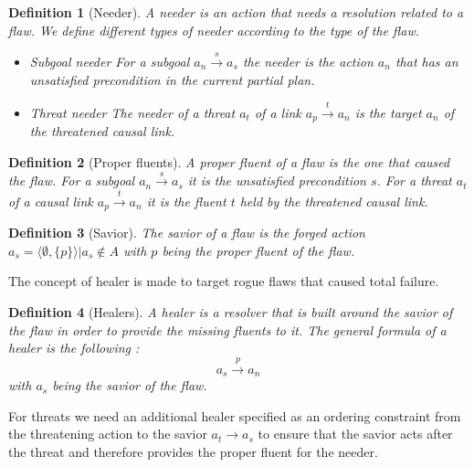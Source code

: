 \documentclass[]{article}
\newtheorem{definition}{Definition}
\begin{document}
\begin{definition}[Needer]

A needer is an action that needs a resolution related to a flaw. We
define different types of needer according to the type of the flaw.

\begin{itemize}
\item
  Subgoal needer For a subgoal \(a_n \xrightarrow{s} a_s\) the needer is
  the action \(a_n\) that has an unsatisfied precondition in the current
  partial plan.
\item
  Threat needer The needer of a threat \(a_t\) of a link
  \(a_p \xrightarrow{t} a_n\) is the target \(a_n\) of the threatened
  causal link.
\end{itemize}

\end{definition}

\begin{definition}[Proper fluents]

A proper fluent of a flaw is the one that caused the flaw. For a subgoal
\(a_n \xrightarrow{s} a_s\) it is the unsatisfied precondition \(s\).
For a threat \(a_t\) of a causal link \(a_p \xrightarrow{t} a_n\) it is
the fluent \(t\) held by the threatened causal link.

\end{definition}

\begin{definition}[Savior]

The savior of a flaw is the forged action
\(a_s = \langle \emptyset, \{p\} \rangle | a_s \notin A\) with \(p\)
being the proper fluent of the flaw.

\end{definition}

The concept of healer is made to target rogue flaws that caused total
failure.

\begin{definition}[Healers]

A healer is a resolver that is built around the savior of the flaw in
order to provide the missing fluents to it. The general formula of a
healer is the following : \[a_s \xrightarrow{p} a_n\] with \(a_s\) being
the savior of the flaw.

\end{definition}

For threats we need an additional healer specified as an ordering
constraint from the threatening action to the savior \(a_t \to a_s\) to
ensure that the savior acts after the threat and therefore provides the
proper fluent for the needer.
\end{document}

